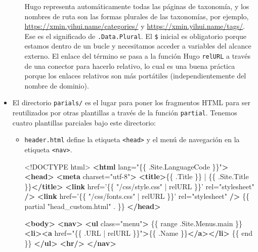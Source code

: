 \documentclass[12pt,]{krantz}
\makeatletter
\newenvironment{Shaded}{\begin{snugshade}}{\end{snugshade}}
\newcommand{\DataTypeTok}[1]{\textcolor[rgb]{0.13,0.29,0.53}{#1}}
\newcommand{\KeywordTok}[1]{\textcolor[rgb]{0.13,0.29,0.53}{\textbf{#1}}}
\newcommand{\NormalTok}[1]{#1}
\newcommand{\OtherTok}[1]{\textcolor[rgb]{0.56,0.35,0.01}{#1}}
\newcommand{\StringTok}[1]{\textcolor[rgb]{0.31,0.60,0.02}{#1}}
\newenvironment{kframe}{%
\medskip{}
\setlength{\fboxsep}{.8em}
 \def\at@end@of@kframe{}%
 \ifinner\ifhmode%
  \def\at@end@of@kframe{\end{minipage}}%
  \begin{minipage}{\columnwidth}%
 \fi\fi%
 \def\FrameCommand##1{\hskip\@totalleftmargin \hskip-\fboxsep
 \colorbox{shadecolor}{##1}\hskip-\fboxsep
     \hskip-\linewidth \hskip-\@totalleftmargin \hskip\columnwidth}%
 \MakeFramed {\advance\hsize-\width
   \@totalleftmargin\z@ \linewidth\hsize
   \@setminipage}}%
 {\par\unskip\endMakeFramed%
 \at@end@of@kframe}
\renewenvironment{Shaded}{\begin{kframe}}{\end{kframe}}
\theoremstyle{definition}
\theoremstyle{definition}
\theoremstyle{definition}
\theoremstyle{remark}
\makeatother
\begin{document}
\begin{itemize}
\begin{itemize}
    Hugo representa automáticamente todas las páginas de taxonomía, y
    los nombres de ruta son las formas plurales de las taxonomías, por
    ejemplo, \url{https://xmin.yihui.name/categories/} y
    \url{https://xmin.yihui.name/tags/}. Ese es el significado de
    \texttt{.Data.Plural}. El \texttt{\$} inicial es obligatorio porque
    estamos dentro de un bucle y necesitamos acceder a variables del
    alcance externo. El enlace del término se pasa a la función Hugo
    \texttt{relURL} a través de una conector \texttt{\textbar{}} para
    hacerlo relativo, lo cual es una buena práctica porque los enlaces
    relativos son más portátiles (independientemente del nombre de
    dominio).
  \end{itemize}
\item
  El directorio \texttt{parials/} es el lugar para poner los fragmentos
  HTML para ser reutilizados por otras plantillas a través de la función
  \texttt{partial}. Tenemos cuatro plantillas parciales bajo este
  directorio:

  \begin{itemize}
  \item
    \texttt{header.html} define la etiqueta
    \texttt{\textless{}head\textgreater{}} y el menú de navegación en la
    etiqueta \texttt{\textless{}nav\textgreater{}}.

\begin{Shaded}
\begin{Highlighting}[]
\DataTypeTok{<!DOCTYPE }\NormalTok{html}\DataTypeTok{>}
\KeywordTok{<html}\OtherTok{ lang=}\StringTok{"\{\{ .Site.LanguageCode \}\}"}\KeywordTok{>}
  \KeywordTok{<head>}
    \KeywordTok{<meta}\OtherTok{ charset=}\StringTok{"utf-8"}\KeywordTok{>}
    \KeywordTok{<title>}\NormalTok{\{\{ .Title \}\} | \{\{ .Site.Title \}\}}\KeywordTok{</title>}
    \KeywordTok{<link}\OtherTok{ href=}\StringTok{'\{\{ "/css/style.css" | relURL \}\}'}
\OtherTok{      rel=}\StringTok{"stylesheet"} \KeywordTok{/>}
    \KeywordTok{<link}\OtherTok{ href=}\StringTok{'\{\{ "/css/fonts.css" | relURL \}\}'}
\OtherTok{      rel=}\StringTok{"stylesheet"} \KeywordTok{/>}
\NormalTok{    \{\{ partial "head_custom.html" . \}\}}
  \KeywordTok{</head>}

  \KeywordTok{<body>}
    \KeywordTok{<nav>}
    \KeywordTok{<ul}\OtherTok{ class=}\StringTok{"menu"}\KeywordTok{>}
\NormalTok{      \{\{ range .Site.Menus.main \}\}}
      \KeywordTok{<li><a}\OtherTok{ href=}\StringTok{"\{\{ .URL | relURL \}\}"}\KeywordTok{>}\NormalTok{\{\{ .Name \}\}}\KeywordTok{</a></li>}
\NormalTok{      \{\{ end \}\}}
    \KeywordTok{</ul>}
    \KeywordTok{<hr/>}
    \KeywordTok{</nav>}
\end{Highlighting}
\end{Shaded}


\end{itemize}
\end{itemize}
\end{document}
